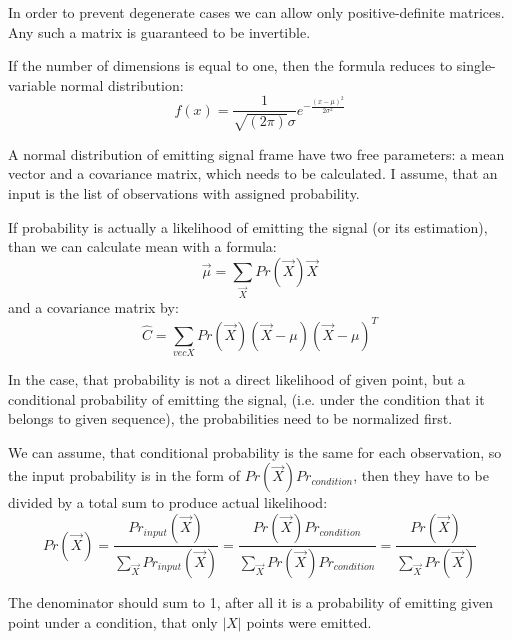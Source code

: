 \documentclass[12pt,a4paper,english]{article}
\begin{document}
In order to prevent degenerate cases we can allow only positive-definite matrices. \newline
Any such a matrix is guaranteed to be invertible. \newline


If the number of dimensions is equal to one, then the formula reduces to single-variable normal distribution: 
\begin{equation}
    f(x) = \frac 1 {\sqrt{(2\pi)}\sigma}e^{-{ \frac {(x-\mu)^2}{2 \sigma^2}}}
\end{equation}


\newpage

A normal distribution of emitting signal frame have two free parameters: a mean vector and a covariance matrix,
which needs to be calculated.\newline
I assume, that an input is the list of observations with assigned probability.\newline 

If probability is actually a likelihood of emitting the signal (or its estimation),
than we can calculate mean with a formula:   
\begin{equation}
    \vec \mu = \sum_{\vec X} Pr(\vec X) \vec X
\end{equation}
and a covariance matrix by: 
\begin{equation}
    \hat C = \sum_{vec X} Pr(\vec X) (\vec X - \mu) (\vec X - \mu)^T
\end{equation}
\newline


In the case, that probability is not a direct likelihood of given point, but a conditional probability of emitting the signal,
(i.e. under the condition that it belongs to given sequence), the probabilities need to be normalized first. \newline

We can assume, that conditional probability is the same for each observation,
 so the input probability is in the form of $ Pr(\vec X) Pr_{condition}$,
then they have to be divided by a total sum to produce actual likelihood:
\begin{equation}
    Pr(\vec X) = \frac{Pr_{input}(\vec X)}{\sum_{\vec X} Pr_{input}(\vec X)} = \frac{Pr(\vec X) Pr_{condition}}{\sum_{\vec X} Pr(\vec X) Pr_{condition}} = 
\frac{Pr(\vec X)}{\sum_{\vec X} Pr(\vec X)}
\end{equation}

The denominator should sum to 1, after all it is a probability of emitting given point under a condition, that only $|X|$ points were emitted.
\end{document}
